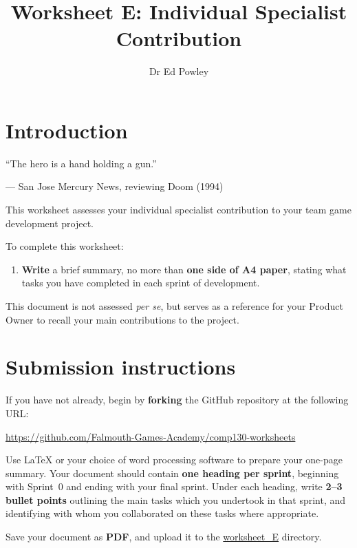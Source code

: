 \documentclass{../../fal_assignment}
\title{Worksheet E: Individual Specialist Contribution}
\author{Dr Ed Powley}
\begin{document}
\maketitle

\section*{Introduction}

\begin{marginquote}
``The hero is a hand holding a gun.''

--- San Jose Mercury News, reviewing Doom (1994)
\end{marginquote}

This worksheet assesses your individual specialist contribution to your team game
development project.

To complete this worksheet:
\begin{enumerate}[label=(\alph*)]
	\item \textbf{Write} a brief summary, no more than \textbf{one side of A4 paper},
		stating what tasks you have completed in each sprint of development.
\end{enumerate}

This document is not assessed \textit{per se}, but serves as a reference for your Product Owner
to recall your main contributions to the project.

\section*{Submission instructions}

If you have not already, begin by \textbf{forking} the GitHub repository at the following URL:

\url{https://github.com/Falmouth-Games-Academy/comp130-worksheets}

Use LaTeX or your choice of word processing software to prepare your one-page summary.
Your document should contain \textbf{one heading per sprint}, beginning with Sprint~0 and ending with your final sprint.
Under each heading, write \textbf{2--3 bullet points} outlining the main tasks which you undertook in that sprint,
and identifying with whom you collaborated on these tasks where appropriate.

Save your document as \textbf{PDF}, and upload it to the \url{worksheet_E} directory.
\end{document}
